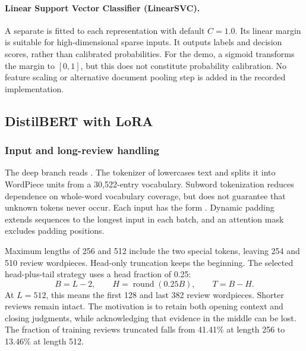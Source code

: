 \paragraph{Linear Support Vector Classifier (LinearSVC).}
A separate  is fitted to each representation with default
$C=1.0$. Its linear margin is suitable for high-dimensional sparse inputs.
It outputs labels and decision scores, rather than calibrated probabilities.
For the demo, a sigmoid transforms the margin to $[0,1]$, but this does not
constitute probability calibration. No feature scaling or alternative document
pooling step is added in the recorded implementation.

\subsection{DistilBERT with LoRA}\label{sec:dlmethod}
\subsubsection{Input and long-review handling}
The deep branch reads . The tokenizer of
 lowercases text and splits it into WordPiece units
from a 30,522-entry vocabulary. Subword tokenization reduces dependence on
whole-word vocabulary coverage, but does not guarantee that unknown tokens
never occur. Each input has the form .
Dynamic padding extends sequences to the longest input in each batch, and an
attention mask excludes padding positions.

Maximum lengths of 256 and 512 include the two special tokens, leaving 254 and
510 review wordpieces. Head-only truncation keeps the beginning. The selected
head-plus-tail strategy uses a head fraction of 0.25:
\begin{equation}
 B=L-2,\qquad H=\operatorname{round}(0.25B),\qquad T=B-H.
\end{equation}
At $L=512$, this means the first 128 and last 382 review wordpieces. Shorter
reviews remain intact. The motivation is to retain both opening context and
closing judgments, while acknowledging that evidence in the middle can be lost.
The fraction of training reviews truncated falls from 41.41\% at length 256 to
13.46\% at length 512.

